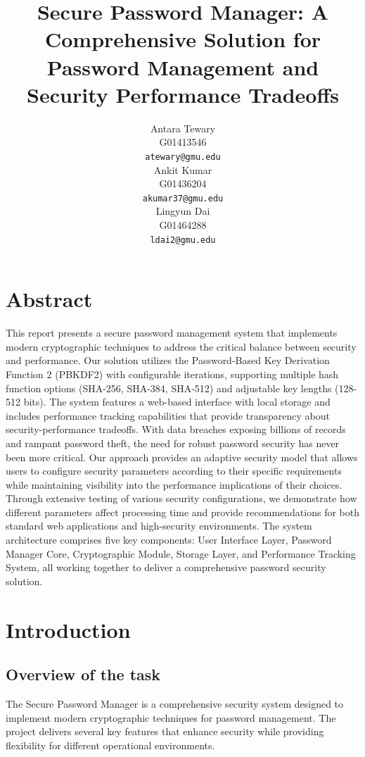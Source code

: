 \documentclass[11pt,a4paper]{article}
\title{Secure Password Manager: A Comprehensive Solution for Password Management and Security Performance Tradeoffs}
\author{Antara Tewary \\
  G01413546 \\
  \texttt{atewary@gmu.edu} \\\And
  Ankit Kumar\\
  G01436204\\
  \texttt{akumar37@gmu.edu} \\\And 
  Lingyun Dai\\ 
  G01464288\\ 
  \texttt{ldai2@gmu.edu} \\}
\date{}
\begin{document}
\maketitle
\section{Abstract}
This report presents a secure password management system that implements modern cryptographic techniques to address the critical balance between security and performance. Our solution utilizes the Password-Based Key Derivation Function 2 (PBKDF2) with configurable iterations, supporting multiple hash function options (SHA-256, SHA-384, SHA-512) and adjustable key lengths (128-512 bits). The system features a web-based interface with local storage and includes performance tracking capabilities that provide transparency about security-performance tradeoffs.
With data breaches exposing billions of records and rampant password theft, the need for robust password security has never been more critical. Our approach provides an adaptive security model that allows users to configure security parameters according to their specific requirements while maintaining visibility into the performance implications of their choices. Through extensive testing of various security configurations, we demonstrate how different parameters affect processing time and provide recommendations for both standard web applications and high-security environments. The system architecture comprises five key components: User Interface Layer, Password Manager Core, Cryptographic Module, Storage Layer, and Performance Tracking System, all working together to deliver a comprehensive password security solution.
\section{Introduction}

            \subsection{Overview of the task}
            The Secure Password Manager is a comprehensive security system designed to implement modern cryptographic techniques for password management. The project delivers several key features that enhance security while providing flexibility for different operational environments. 
            
\end{document}
